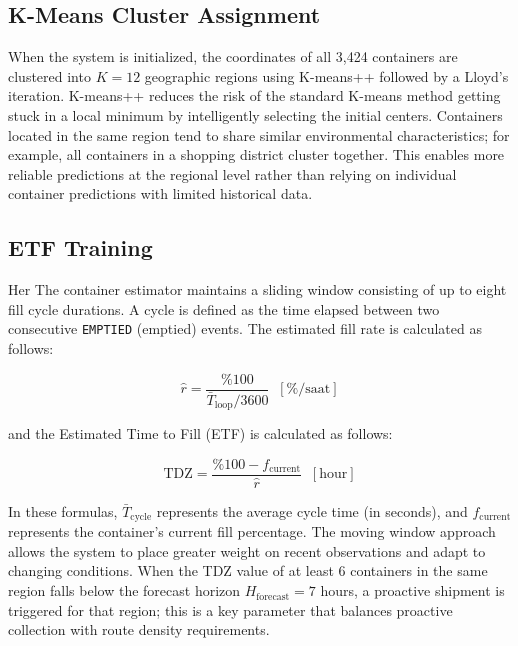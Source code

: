 \documentclass[12pt,a4paper]{report}
\begin{document}
\subsection{K-Means Cluster Assignment}

\indent When the system is initialized, the coordinates of all 3,424 containers are clustered into $K = 12$ geographic regions using K-means++ followed by a Lloyd’s iteration. K-means++ reduces the risk of the standard K-means method getting stuck in a local minimum by intelligently selecting the initial centers. Containers located in the same region tend to share similar environmental characteristics; for example, all containers in a shopping district cluster together. This enables more reliable predictions at the regional level rather than relying on individual container predictions with limited historical data.

\subsection{ETF Training }

\indent Her The container estimator maintains a sliding window consisting of up to eight fill cycle durations. A cycle is defined as the time elapsed between two consecutive \texttt{EMPTIED} (emptied) events. The estimated fill rate is calculated as follows:

\begin{equation}
  \hat{r} = \frac{\%100}{\bar{T}_{\text{loop}} / 3600}\;\; [\%/\text{saat}]
  \label{eq:fill_rate}
\end{equation}

\indent and the Estimated Time to Fill (ETF) is calculated as follows:

\begin{equation}
  \text{TDZ} = \frac{\%100 - f_{\text{current}}}{\hat{r}}\;\; [\text{hour}]
  \label{eq:etf}
\end{equation}

\indent In these formulas, $\bar{T}_{\text{cycle}}$ represents the average cycle time (in seconds), and $f_{\text{current}}$ represents the container’s current fill percentage. The moving window approach allows the system to place greater weight on recent observations and adapt to changing conditions. When the TDZ value of at least 6 containers in the same region falls below the forecast horizon $H_{\text{forecast}} = 7$ hours, a proactive shipment is triggered for that region; this is a key parameter that balances proactive collection with route density requirements.
\end{document}
